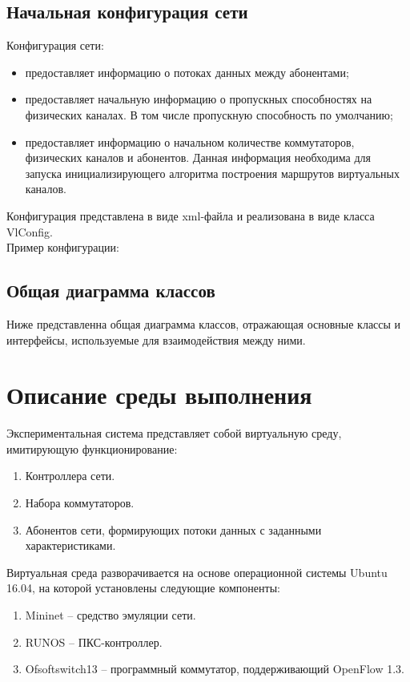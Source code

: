 \documentclass[12pt]{article}
\begin{document}
	\subsection{Начальная конфигурация сети}
	
	Конфигурация сети:
	\begin{itemize}
		\item предоставляет информацию о потоках данных между абонентами;
		\item предоставляет начальную информацию о пропускных способностях на физических каналах. В том числе пропускную способность по умолчанию;
		\item предоставляет информацию о начальном количестве коммутаторов, физических каналов и абонентов. Данная информация необходима для запуска инициализирующего алгоритма построения маршрутов виртуальных каналов.
	\end{itemize}
	
	\noindent
	Конфигурация представлена в виде xml-файла и реализована в виде класса VlConfig. \\
	Пример конфигурации:
	\lstset{ language=xml,
		breaklines=true,
		basicstyle=\footnotesize\ttfamily}
	\linespread{1}
	
	
	\subsection{Общая диаграмма классов}
	Ниже представленна общая диаграмма классов, отражающая основные классы и интерфейсы, используемые для взаимодействия между ними.
	

	\section{Описание среды выполнения}
	Экспериментальная система представляет собой виртуальную среду, имитирующую функционирование:
	\begin{enumerate}
		\item Контроллера сети.
		\item Набора коммутаторов.
		\item Абонентов сети, формирующих потоки данных с заданными характеристиками.
	\end{enumerate}
	\noindent
	Виртуальная среда разворачивается на основе операционной системы Ubuntu 16.04, на которой установлены следующие компоненты:
	\begin{enumerate}
		\item Mininet – средство эмуляции сети.
		\item RUNOS – ПКС-контроллер.
		\item Ofsoftswitch13 – программный коммутатор, поддерживающий OpenFlow 1.3.
	\end{enumerate}
\end{document}

